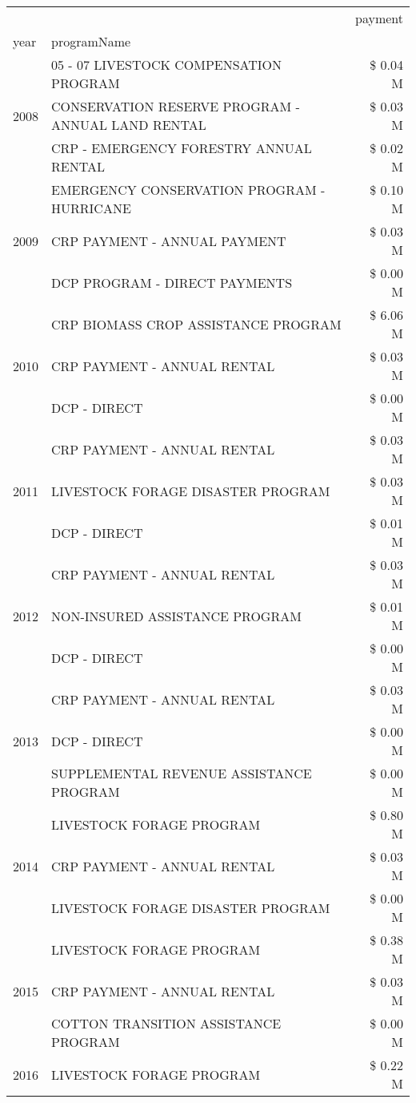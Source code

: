 \begin{tabular}{llr}
\toprule
 &  & payment \\
year & programName &  \\
\midrule
\multirow[t]{3}{*}{2008} & 05 - 07 LIVESTOCK COMPENSATION PROGRAM & \$ 0.04 M \\
 & CONSERVATION RESERVE PROGRAM - ANNUAL LAND RENTAL & \$ 0.03 M \\
 & CRP - EMERGENCY FORESTRY ANNUAL RENTAL & \$ 0.02 M \\
\cline{1-3}
\multirow[t]{3}{*}{2009} & EMERGENCY CONSERVATION PROGRAM - HURRICANE & \$ 0.10 M \\
 & CRP PAYMENT - ANNUAL PAYMENT & \$ 0.03 M \\
 & DCP PROGRAM - DIRECT PAYMENTS & \$ 0.00 M \\
\cline{1-3}
\multirow[t]{3}{*}{2010} & CRP BIOMASS CROP ASSISTANCE PROGRAM & \$ 6.06 M \\
 & CRP PAYMENT - ANNUAL RENTAL & \$ 0.03 M \\
 & DCP - DIRECT & \$ 0.00 M \\
\cline{1-3}
\multirow[t]{3}{*}{2011} & CRP PAYMENT - ANNUAL RENTAL & \$ 0.03 M \\
 & LIVESTOCK FORAGE DISASTER PROGRAM & \$ 0.03 M \\
 & DCP - DIRECT & \$ 0.01 M \\
\cline{1-3}
\multirow[t]{3}{*}{2012} & CRP PAYMENT - ANNUAL RENTAL & \$ 0.03 M \\
 & NON-INSURED ASSISTANCE PROGRAM & \$ 0.01 M \\
 & DCP - DIRECT & \$ 0.00 M \\
\cline{1-3}
\multirow[t]{3}{*}{2013} & CRP PAYMENT - ANNUAL RENTAL & \$ 0.03 M \\
 & DCP - DIRECT & \$ 0.00 M \\
 & SUPPLEMENTAL REVENUE ASSISTANCE PROGRAM & \$ 0.00 M \\
\cline{1-3}
\multirow[t]{3}{*}{2014} & LIVESTOCK FORAGE PROGRAM & \$ 0.80 M \\
 & CRP PAYMENT - ANNUAL RENTAL & \$ 0.03 M \\
 & LIVESTOCK FORAGE DISASTER PROGRAM & \$ 0.00 M \\
\cline{1-3}
\multirow[t]{3}{*}{2015} & LIVESTOCK FORAGE PROGRAM & \$ 0.38 M \\
 & CRP PAYMENT - ANNUAL RENTAL & \$ 0.03 M \\
 & COTTON TRANSITION ASSISTANCE PROGRAM & \$ 0.00 M \\
\cline{1-3}
\multirow[t]{3}{*}{2016} & LIVESTOCK FORAGE PROGRAM & \$ 0.22 M \\

\end{tabular}
